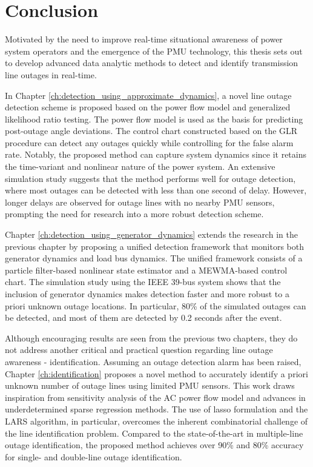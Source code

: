 \chapter{Conclusion}
\label{ch:conclusion}

Motivated by the need to improve real-time situational awareness of power system operators and the emergence of the PMU technology, this thesis sets out to develop advanced data analytic methods to detect and identify transmission line outages in real-time.

In Chapter \ref{ch:detection_using_approximate_dynamics}, a novel line outage detection scheme is proposed based on the power flow model and generalized likelihood ratio testing. The power flow model is used as the basis for predicting post-outage angle deviations. The control chart constructed based on the GLR procedure can detect any outages quickly while controlling for the false alarm rate. Notably, the proposed method can capture system dynamics since it retains the time-variant and nonlinear nature of the power system. An extensive simulation study suggests that the method performs well for outage detection, where most outages can be detected with less than one second of delay. However, longer delays are observed for outage lines with no nearby PMU sensors, prompting the need for research into a more robust detection scheme.

Chapter \ref{ch:detection_using_generator_dynamics} extends the research in the previous chapter by proposing a unified detection framework that monitors both generator dynamics and load bus dynamics. The unified framework consists of a particle filter-based nonlinear state estimator and a MEWMA-based control chart. The simulation study using the IEEE 39-bus system shows that the inclusion of generator dynamics makes detection faster and more robust to a priori unknown outage locations. In particular, 80\% of the simulated outages can be detected, and most of them are detected by 0.2 seconds after the event. 

Although encouraging results are seen from the previous two chapters, they do not address another critical and practical question regarding line outage awareness - identification. Assuming an outage detection alarm has been raised, Chapter \ref{ch:identification} proposes a novel method to accurately identify a priori unknown number of outage lines using limited PMU sensors. This work draws inspiration from sensitivity analysis of the AC power flow model and advances in underdetermined sparse regression methods. The use of lasso formulation and the LARS algorithm, in particular, overcomes the inherent combinatorial challenge of the line identification problem. Compared to the state-of-the-art in multiple-line outage identification, the proposed method achieves over 90\% and 80\% accuracy for single- and double-line outage identification. 

